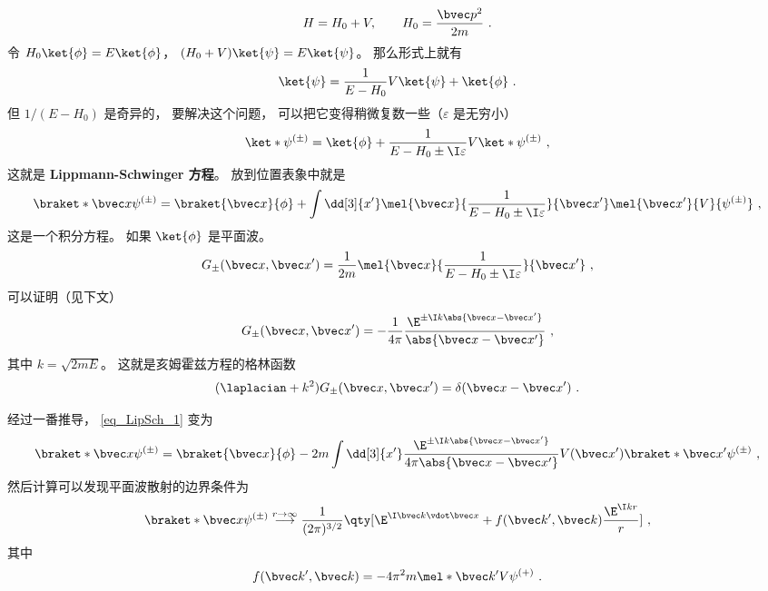 

\begin{equation}
H = H_0 + V, \qquad H_0 = \frac{\bvec p^2}{2m}~.
\end{equation}
令 $H_0\ket{\phi} = E\ket{\phi}$， $(H_0+V)\ket{\psi}=E\ket{\psi}$。 那么形式上就有
\begin{equation}
\ket{\psi} = \frac{1}{E-H_0} V\ket{\psi} + \ket{\phi}~.
\end{equation}
但 $1/(E-H_0)$ 是奇异的， 要解决这个问题， 可以把它变得稍微复数一些（$\varepsilon$ 是无穷小）
\begin{equation}
\ket*{\psi^{(\pm)}} = \ket{\phi} + \frac{1}{E-H_0\pm \I\varepsilon} V \ket*{\psi^{(\pm)}}~,
\end{equation}
这就是 \textbf{Lippmann-Schwinger 方程}。 放到位置表象中就是
\begin{equation}\label{eq_LipSch_1}
\braket*{\bvec x}{\psi^{(\pm)}} = \braket{\bvec x}{\phi} + \int \dd[3]{x'} \mel{\bvec x}{\frac{1}{E-H_0\pm \I\varepsilon}}{\bvec x'} \mel{\bvec x'}{V}{\psi^{(\pm)}}~,
\end{equation}
这是一个积分方程。 如果 $\ket{\phi}$ 是平面波。
\begin{equation}\label{eq_LipSch_2}
G_\pm (\bvec x, \bvec x') = \frac{1}{2m} \mel{\bvec x}{\frac{1}{E-H_0\pm \I\varepsilon}}{\bvec x'}~,
\end{equation}
可以证明（见下文）
\begin{equation}\label{eq_LipSch_3}
G_\pm (\bvec x, \bvec x') = -\frac{1}{4\pi} \frac{\E^{\pm\I k\abs{\bvec x-\bvec x'}}}{\abs{\bvec x-\bvec x'}}~,
\end{equation}
其中 $k = \sqrt{2mE}$。 这就是亥姆霍兹方程的格林函数
\begin{equation}
(\laplacian +k^2)G_\pm (\bvec x, \bvec x') = \delta(\bvec x-\bvec x')~.
\end{equation}

经过一番推导， \autoref{eq_LipSch_1} 变为
\begin{equation}
\braket*{\bvec x}{\psi^{(\pm)}} = \braket{\bvec x}{\phi} - 2m\int \dd[3]{x'} \frac{\E^{\pm\I k\abs{\bvec x-\bvec x'}}}{4\pi\abs{\bvec x-\bvec x'}} V(\bvec x')\braket*{\bvec x'}{\psi^{(\pm)}}~,
\end{equation}
然后计算可以发现平面波散射的边界条件为
\begin{equation}
\braket*{\bvec x}{\psi^{(\pm)}} \overset{r\to\infty}{\longrightarrow} \frac{1}{(2\pi)^{3/2}} \qty[\E^{\I \bvec k\vdot \bvec x} + f(\bvec k', \bvec k)\frac{\E^{\I kr}}{r}]~,
\end{equation}
其中
\begin{equation}
f(\bvec k', \bvec k) = -4\pi^2 m \mel*{\bvec k'}{V}{\psi^{(+)}}~.
\end{equation}


